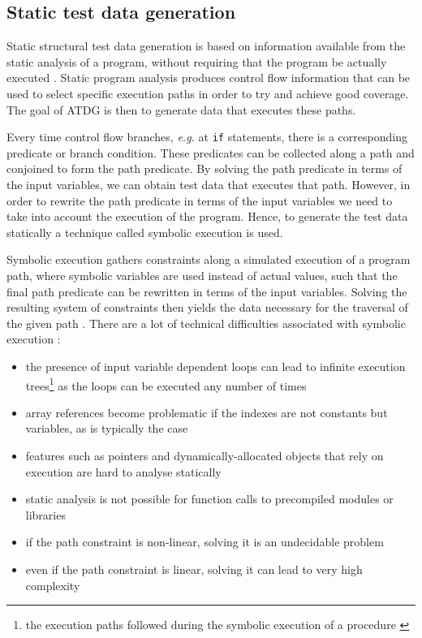 \subsection{Static test data generation}
Static structural test data generation is based on information available from the static analysis of a program, without requiring that the program be actually executed \cite{mcminn2004search}. Static program analysis produces control flow information that can be used to select specific execution paths in order to try and achieve good coverage. The goal of ATDG is then to generate data that executes these paths.

Every time control flow branches, \emph{e.g.} at \texttt{if} statements, there is a corresponding predicate or branch condition. These predicates can be collected along a path and conjoined to form the path predicate. By solving the path predicate in terms of the input variables, we can obtain test data that executes that path. However, in order to rewrite the path predicate in terms of the input variables we need to take into account the execution of the program. Hence, to generate the test data statically a technique called symbolic execution \cite{king1976symbolic} is used.

Symbolic execution gathers constraints along a simulated execution of a program path, where symbolic variables are used instead of actual values, such that the final path predicate can be rewritten in terms of the input variables. Solving the resulting system of constraints then yields the data necessary for the traversal of the given path \cite{king1975new, king1976symbolic}. There are a lot of technical difficulties associated with symbolic execution \cite{edvardsson1999survey,meudec2001atgen,mcminn2004search}:


\begin{itemize}
	\item the presence of input variable dependent loops can lead to infinite execution trees\footnote{the execution paths followed during the symbolic execution of a procedure \cite{king1976symbolic}} as the loops can be executed any number of times
	\item array references become problematic if the indexes are not constants but variables, as is typically the case
	\item features such as pointers and dynamically-allocated objects that rely on execution are hard to analyse statically
	\item static analysis is not possible for function calls to precompiled modules or libraries
	\item if the path constraint is non-linear, solving it is an undecidable problem
	\item even if the path constraint is linear, solving it can lead to very high complexity
\end{itemize}

